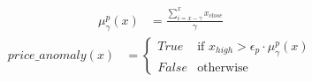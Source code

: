 \begin{align*}
    \mu_\gamma^p(x) &= \frac{\sum^x_{i=x-\gamma} x_{close}}{\gamma}
\end{align*}
\begin{align}\label{eq:price_anomaly}
    price\_anomaly(x)&=
    \begin{cases}
        True  & \text{if $x_{high} >    \epsilon_p \cdot \mu_\gamma^p(x)$}\\
        False & \text{otherwise}
    \end{cases}
\end{align}
